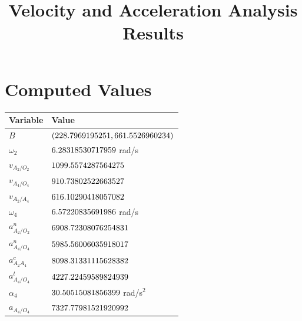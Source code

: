 \documentclass[12pt]{article}
\title{Velocity and Acceleration Analysis Results}
\author{}
\date{}
\begin{document}
\maketitle

\section*{Computed Values}

\begin{tabular}{ll}
\hline
\textbf{Variable} & \textbf{Value} \\
\hline
$B$ & $(228.7969195251, 661.5526960234)$ \\
$\omega_2$ & $6.28318530717959$ rad/s \\
$v_{A_2/O_2}$ & $1099.5574287564275$ \\
$v_{A_4/O_4}$ & $910.73802522663527$ \\
$v_{A_2/A_4}$ & $616.10290418057082$ \\
$\omega_4$ & $6.57220835691986$ rad/s \\
$a^n_{A_2/O_2}$ & $6908.72308076254831$ \\
$a^n_{A_4/O_4}$ & $5985.56006035918017$ \\
$a^c_{A_2 A_4}$ & $8098.31331115628382$ \\
$a^t_{A_4/O_4}$ & $4227.22459589824939$ \\
$\alpha_4$ & $30.50515081856399$ rad/s$^2$ \\
$a_{A_4/O_4}$ & $7327.77981521920992$ \\
\hline
\end{tabular}
\end{document}

